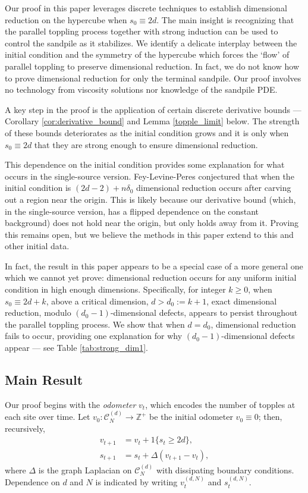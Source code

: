 \documentclass[12pt]{amsart}
\begin{document}
	Our proof in this paper leverages discrete techniques to establish dimensional reduction on the hypercube when $s_0 \equiv 2d$. The main insight is recognizing that the parallel toppling process together with strong induction can be used to control the sandpile as it stabilizes.  We identify a delicate interplay between the initial condition and the symmetry of the hypercube which forces the `flow' of parallel toppling to preserve dimensional reduction. In fact, we do not know how to prove dimensional reduction for only the terminal sandpile. Our proof involves no technology from viscosity solutions nor knowledge of the sandpile PDE.
	
	A key step in the proof is the application of certain discrete derivative bounds  --- Corollary \ref{cor:derivative_bound} and Lemma \ref{topple_limit} below. The strength of these bounds deteriorates as the initial condition grows and it is only when $s_0 \equiv 2d$ that they are strong enough to ensure dimensional reduction. 
	
	This dependence on the initial condition provides some explanation for what occurs in the single-source version. Fey-Levine-Peres conjectured 
	that when 	the initial condition is $(2 d- 2 ) + n \delta_0$  dimensional reduction occurs after carving out a region near the origin. This is likely because 
	our derivative bound (which, in the single-source version, has a flipped dependence on the constant background) does not hold near the origin, but only holds away from it.  Proving this remains open, but we believe the methods in this paper extend to 
	this and other initial data. 
	
	In fact, the result in this paper appears to be a special case of a more general one which we cannot yet prove: dimensional reduction occurs for any uniform initial condition 
	in high enough dimensions. Specifically, for integer $k \geq 0$, when $s_0 \equiv 2d + k$, above a critical dimension, $d > d_0 := k+1$, exact dimensional reduction, modulo $(d_0-1)$-dimensional defects, appears to persist throughout the parallel toppling process. We show that when $d = d_0$, dimensional reduction fails to occur, providing one explanation for why $(d_0-1)$-dimensional defects appear --- see Table \ref{tab:strong_dim1}. 
	

	
	\subsection{Main Result}
	Our proof begins with the {\it odometer} $v_t$, which encodes the number of topples at each site over time. Let $v_0 : \mathcal{C}_N^{(d)} \to \mathbb{Z}^+$ be the initial odometer $v_0 \equiv 0$; then, recursively, 
	\begin{align}
	v_{t+1} &= v_{t} +  1\{ s_{t} \geq 2 d \}, \\
	s_{t+1} &= s_{t} + \Delta ( v_{t+1} - v_{t} ) ,
	\end{align}
	where $\Delta$ is the graph Laplacian on $\mathcal{C}_N^{(d)}$ with dissipating boundary conditions.  Dependence on $d$ and $N$ is indicated by writing $v_t^{(d,N)}$ and $s_t^{(d,N)}$. %
	
\end{document}
